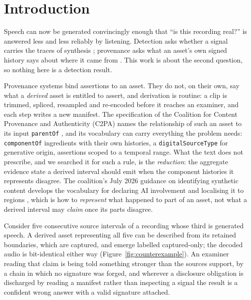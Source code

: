 \documentclass[preprint,3p,11pt,authoryear]{elsarticle}
\begin{document}
\section{Introduction}
\label{sec:intro}

Speech can now be generated convincingly enough that ``is this recording
real?'' is answered less and less reliably by listening. Detection asks whether
a signal carries the traces of synthesis \citep{pham2025survey,wang2026asvspoof5};
provenance asks what an asset's own signed history says about where it came from
\citep{c2pa24}. This work is about the second question, so nothing here is a
detection result.

Provenance systems bind assertions to an asset. They do not, on their own, say
what a \emph{derived} asset is entitled to assert, and derivation is routine: a
clip is trimmed, spliced, resampled and re-encoded before it reaches an
examiner, and each step writes a new manifest. The specification of the Coalition
for Content Provenance and Authenticity (C2PA) names the
relationship of such an asset to its input \texttt{parentOf}
\citep[Table~10, \S18.16.3]{c2pa24}, and its vocabulary can carry everything the
problem needs: \texttt{componentOf} ingredients with their own histories, a
\texttt{digitalSourceType} for generative origin, assertions scoped to a
temporal range. What the text does not prescribe, and we searched it for such a
rule, is the \emph{reduction}: the aggregate evidence state a derived interval
should emit when the component histories it represents disagree. The
coalition's July 2026 guidance on identifying synthetic content develops the
vocabulary for declaring AI involvement and localising it to regions
\citep{c2pa2026synthetic}, which is how to \emph{represent} what happened to
part of an asset, not what a derived interval may \emph{claim} once its parts
disagree.

Consider five consecutive source intervals of a
recording whose third is generated speech. A derived asset representing all five
can be described from its retained boundaries, which are captured, and emerge
labelled captured-only; the decoded audio is bit-identical either way
(Figure~\ref{fig:counterexample}). An examiner reading that claim is being told
something stronger than the sources support, by a chain in which no signature
was forged, and wherever a disclosure obligation is discharged by reading a
manifest rather than inspecting a signal the result is a confident wrong answer with a valid
signature attached.
\end{document}
